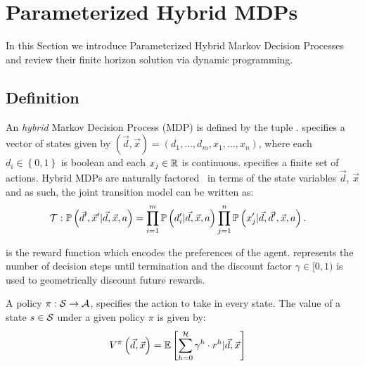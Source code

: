 \section{Parameterized Hybrid MDPs}
\label{sec:hybrid_mdps}

In this Section we introduce Parameterized Hybrid Markov Decision Processes and review their finite horizon solution via dynamic programming.

\subsection{Definition}
\label{sec:hybrid_mdps_def}

An \textit{hybrid} Markov Decision Process (MDP) is defined by the tuple {\footnotesize \MDPTuple}. {\footnotesize \State} specifies a vector of states given by {\footnotesize $( \vec{d}, \vec{x}) = \left( d_1, \ldots, d_m, x_1, \ldots, x_n \right) $}, where each {\footnotesize $ d_i \in \left\lbrace 0, 1 \right\rbrace $} 
is boolean and each $ x_j \in \mathbb{R} $ is continuous. {\footnotesize \Action} specifies a finite set of actions. Hybrid MDPs
are naturally factored~\parencite{Boutilier_JAIR_1999} in terms of the state variables $\vec{d}$, $\vec{x}$ and as such, the joint transition model can be written as:
{\footnotesize
\abovedisplayskip=0pt
\belowdisplayskip=0pt
\begin{align}
    \label{eq:hmdp_tfunc}
    \mathcal{T} : \mathbb{P}\left({\vec{d}', \vec{x}' | \vec{d}, \vec{x}, a}\right) &= \prod_{i=1}^{m} \mathbb{P}\left({d_i' | \vec{d}, \vec{x}, a}\right) \prod_{j=1}^{n} \mathbb{P}\left({x_j' | \vec{d}, \vec{d}', \vec{x}, a}\right). 
\end{align}   
}

{\footnotesize \RewardFunc} is the reward function which encodes the preferences of the agent. {\footnotesize \Horizon} represents the number of decision steps until termination and the discount factor {\footnotesize $\gamma \in [0, 1)$} is used to geometrically discount future rewards.

A policy $\pi : \mathcal{S} \rightarrow \mathcal{A}$, specifies the action to take in every state. The value of a state $s \in \mathcal{S}$ under a given policy $\pi$ is given by:
{\footnotesize 
    \abovedisplayskip=0pt
    \belowdisplayskip=0pt
\begin{align*}
    V^{\pi}\left( \vec{d}, \vec{x} \right) &= {\mathbb{E}\left[{\sum\limits_{h = 0}^{\mathcal{H}} \gamma^h \cdot r^h | \vec{d}, \vec{x}}\right]} \nonumber  
\end{align*}
}

